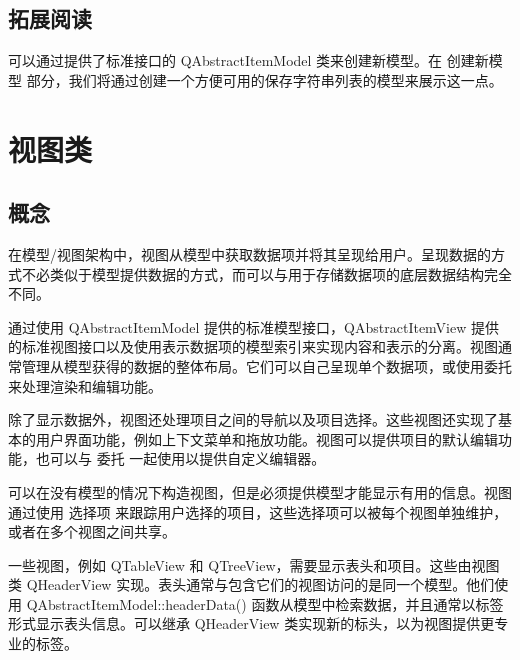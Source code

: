 \subsection{拓展阅读}

可以通过提供了标准接口的 QAbstractItemModel 类来创建新模型。在 创建新模型 部分，我们将通过创建一个方便可用的保存字符串列表的模型来展示这一点。

\section{视图类}
\subsection{概念}

在模型/视图架构中，视图从模型中获取数据项并将其呈现给用户。呈现数据的方式不必类似于模型提供数据的方式，而可以与用于存储数据项的底层数据结构完全不同。

通过使用 QAbstractItemModel 提供的标准模型接口，QAbstractItemView 提供的标准视图接口以及使用表示数据项的模型索引来实现内容和表示的分离。视图通常管理从模型获得的数据的整体布局。它们可以自己呈现单个数据项，或使用委托来处理渲染和编辑功能。

除了显示数据外，视图还处理项目之间的导航以及项目选择。这些视图还实现了基本的用户界面功能，例如上下文菜单和拖放功能。视图可以提供项目的默认编辑功能，也可以与 委托 一起使用以提供自定义编辑器。

可以在没有模型的情况下构造视图，但是必须提供模型才能显示有用的信息。视图通过使用 选择项 来跟踪用户选择的项目，这些选择项可以被每个视图单独维护，或者在多个视图之间共享。

一些视图，例如 QTableView 和 QTreeView，需要显示表头和项目。这些由视图类 QHeaderView 实现。表头通常与包含它们的视图访问的是同一个模型。他们使用 QAbstractItemModel::headerData() 函数从模型中检索数据，并且通常以标签形式显示表头信息。可以继承 QHeaderView 类实现新的标头，以为视图提供更专业的标签。

